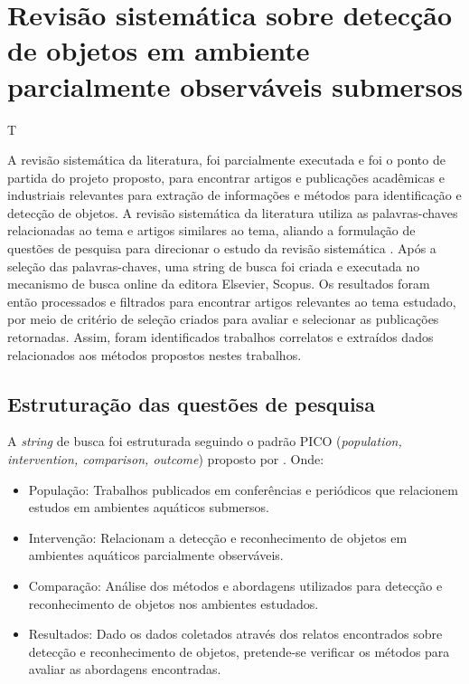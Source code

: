  
\section{Revisão sistemática sobre detecção de objetos em ambiente parcialmente observáveis submersos}T

  A revisão sistemática da literatura, foi parcialmente executada e foi o ponto de partida do projeto proposto, para encontrar artigos e publicações acadêmicas e industriais relevantes para extração de informações e métodos para identificação e detecção de objetos. A revisão sistemática da literatura utiliza as palavras-chaves relacionadas ao tema e artigos similares ao tema, aliando a formulação de questões de pesquisa para direcionar o estudo da revisão sistemática . Após a seleção das palavras-chaves, uma string de busca foi criada e executada no mecanismo de busca online da editora Elsevier, Scopus. Os resultados foram então processados e filtrados para encontrar artigos relevantes ao tema estudado, por meio de critério de seleção criados para avaliar e selecionar as publicações retornadas. Assim, foram  identificados  trabalhos correlatos e extraídos dados relacionados aos métodos propostos nestes trabalhos.




\subsection{Estruturação das questões de pesquisa}
A \textit{string} de busca foi estruturada seguindo o padrão PICO (\textit{population, intervention, comparison, outcome}) proposto por .
Onde:
 \begin{itemize}
 \item  População: Trabalhos publicados em conferências e periódicos que relacionem estudos em ambientes aquáticos submersos.
 \item Intervenção: Relacionam a detecção e reconhecimento de objetos em ambientes aquáticos parcialmente observáveis.
 \item Comparação:  Análise dos métodos e abordagens utilizados para detecção e reconhecimento de objetos nos ambientes estudados.
 \item Resultados: Dado os dados coletados através dos relatos encontrados sobre detecção e reconhecimento de objetos, pretende-se verificar os métodos para avaliar as abordagens encontradas.
 \end{itemize}

